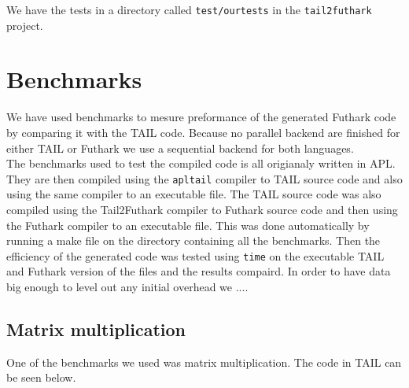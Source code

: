 \documentclass[11pt]{article}
\begin{document}

We have the tests in a directory called {\tt test/ourtests} in the {\tt tail2futhark} project. \\



\section{Benchmarks}
\label{sec:benchmarks}
We have used benchmarks to mesure preformance of the generated Futhark code by comparing it with the TAIL code.
Because no parallel backend are finished for either TAIL or Futhark we use a sequential backend for both languages. \\

The benchmarks used to test the compiled code is all origianaly written in APL. They are then compiled using the {\tt apltail} compiler to TAIL source code and also using the same compiler to an executable file. The TAIL source code was also compiled using the Tail2Futhark compiler to Futhark source code and then using the Futhark compiler to an executable file. This was done automatically by running a make file on the directory containing all the benchmarks.
Then the efficiency of the generated code was tested using {\tt time} on the executable TAIL and Futhark version of the files and the results compaird. In order to have data big enough to level out any initial overhead we ....\\

\subsection{Matrix multiplication}

One of the benchmarks we used was matrix multiplication. The code in TAIL can be seen below. 
\end{document}
